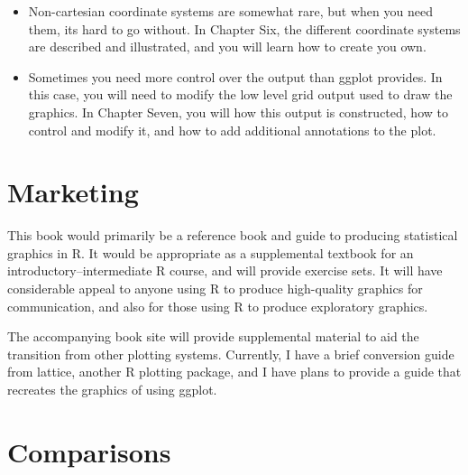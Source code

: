 \documentclass[oneside,letterpaper]{scrartcl}
\begin{document}
\begin{itemize}
	\item Non-cartesian coordinate systems are somewhat rare, but when you need them, its hard to go without.  In Chapter Six, the different coordinate systems are described and illustrated, and you will learn how to create you own.
	
	\item Sometimes you need more control over the output than ggplot provides.  In this case, you will need to modify the low level grid output used to draw the graphics.  In Chapter Seven, you will how this output is constructed, how to control and modify it, and how to add additional annotations to the plot.

\end{itemize}


\section{Marketing}\label{sec:marketing} 


This book would primarily be a reference book and guide to producing statistical graphics in R.  It would be appropriate as a supplemental textbook for an introductory--intermediate R course, and will provide exercise sets.  It will have considerable appeal to anyone using R to produce high-quality graphics for communication, and also for those using R to produce exploratory graphics.  

The accompanying book site will provide supplemental material to aid the transition from other plotting systems.  Currently, I have a brief conversion guide from lattice, another R plotting package, and I have plans to provide a guide that recreates the graphics of \citet{wilkinson:2006} using ggplot.

\section{Comparisons}\label{sec:comparisons} 
\end{document}
